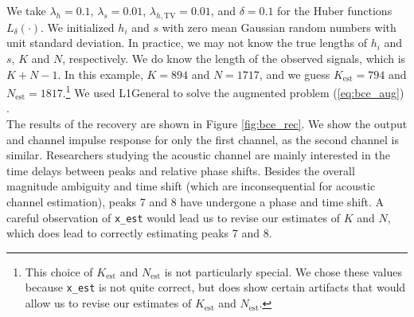\documentclass[journal]{IEEEtran}
\begin{document}
We take $\lambda_h = 0.1$, $\lambda_s=0.01$, $\lambda_{h,\text{TV}}=0.01$, and $\delta=0.1$ for the Huber functions $L_\delta(\cdot)$.  We initialized $h_i$ and $s$ with zero mean Gaussian random numbers with unit standard deviation.  In practice, we may not know the true lengths of $h_i$ and $s$, $K$ and $N$, respectively.  We do know the length of the observed signals, which is $K+N-1$.  In this example, $K=894$ and $N=1717$, and we guess $K_\text{est}=794$ and $N_\text{est}=1817$.\footnote{This choice of $K_\text{est}$ and $N_\text{est}$ is not particularly special.  We chose these values because \texttt{x\_est} is not quite correct, but does show certain artifacts that would allow us to revise our estimates of $K_\text{est}$ and $N_\text{est}$.}  We used L1General to solve the augmented problem (\ref{eq:bce_aug}) \cite{schmidt_2010}.\\

The results of the recovery are shown in Figure \ref{fig:bce_rec}.  We show the output and channel impulse response for only the first channel, as the second channel is similar.  Researchers studying the acoustic channel are mainly interested in the time delays between peaks and relative phase shifts.  Besides the overall magnitude ambiguity and time shift (which are inconsequential for acoustic channel estimation), peaks 7 and 8 have undergone a phase and time shift.  A careful observation of \texttt{x\_est} would lead us to revise our estimates of $K$ and $N$, which does lead to correctly estimating peaks 7 and 8.\\
\end{document}
